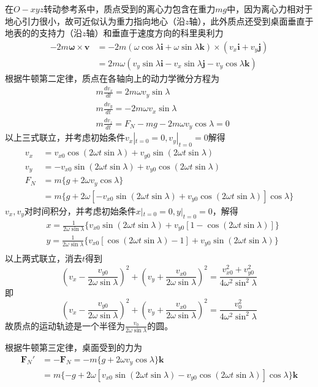 \documentclass[10pt,a4paper]{article}
\theoremstyle{remark}
\begin{document}
在$O-xyz$转动参考系中，质点受到的离心力包含在重力$mg$中，因为离心力相对于地心引力很小，故可近似认为重力指向地心（沿$z$轴），此外质点还受到桌面垂直于地表的的支持力（沿$z$轴）和垂直于速度方向的科里奥利力
\begin{align*}
-2m\bm{\omega}\times\bm{v} &= -2m(\omega\cos\lambda\bm{i} + \omega\sin\lambda\bm{k})\times(v_x\bm{i} + v_y\bm{j})\\
&= 2m\omega(v_y\sin\lambda\bm{i} - v_x\sin\lambda\bm{j} - v_y\cos\lambda\bm{k})
\end{align*}
根据牛顿第二定律，质点在各轴向上的动力学微分方程为
\begin{align*}
&m\frac{dv_x}{dt} = 2m\omega v_y\sin\lambda\\
&m\frac{dv_y}{dt} = -2m\omega v_x\sin\lambda\\
&m\frac{dv_z}{dt} = F_N - mg - 2m\omega v_y\cos\lambda = 0
\end{align*}
以上三式联立，并考虑初始条件$v_x|_{t = 0} = 0, v_y|_{t = 0} = 0$解得
\begin{align*}
v_x &= v_{x0}\cos(2\omega t\sin\lambda) + v_{y0}\sin(2\omega t\sin\lambda)\\
v_y &= -v_{x0}\sin(2\omega t\sin\lambda) + v_{y0}\cos(2\omega t\sin\lambda)\\
F_N &= m\{g + 2\omega v_y\cos\lambda\}\\
&= m\{g + 2\omega[-v_{x0}\sin(2\omega t\sin\lambda) + v_{y0}\cos(2\omega t\sin\lambda)]\cos\lambda\}
\end{align*}
$v_x, v_y$对时间积分，并考虑初始条件$x|_{t = 0} = 0,y|_{t = 0} = 0$，解得
\begin{align*}
&x = \frac{1}{2\omega\sin\lambda}\{v_{x0}\sin(2\omega t\sin\lambda) + v_{y0}[1 - \cos(2\omega t\sin\lambda)]\}\\
&y = \frac{1}{2\omega\sin\lambda}\{v_{x0}[\cos(2\omega t\sin\lambda) - 1] + v_{y0}\sin(2\omega t\sin\lambda)\}\\
\end{align*}
以上两式联立，消去$t$得到
\[
(v_{x} - \frac{v_{y0}}{2\omega\sin\lambda})^2 + (v_{y} + \frac{v_{x0}}{2\omega\sin\lambda})^2 = \frac{v_{x0}^2 + v_{y0}^2}{4\omega^2\sin^2\lambda}
\]
即
\[
(v_{x} - \frac{v_{y0}}{2\omega\sin\lambda})^2 + (v_{y} + \frac{v_{x0}}{2\omega\sin\lambda})^2 = \frac{v_0^2}{4\omega^2\sin^2\lambda}
\]
故质点的运动轨迹是一个半径为$\frac{v_0}{2\omega\sin\lambda}$的圆。

根据牛顿第三定律，桌面受到的力为
\begin{align*}
\bm{F}_{N}' &= -\bm{F}_{N}= -m\{g + 2\omega v_y\cos\lambda\}\bm{k}\\
&= m\{-g + 2\omega[v_{x0}\sin(2\omega t\sin\lambda) - v_{y0}\cos(2\omega t\sin\lambda)]\cos\lambda\}\bm{k}
\end{align*}
\end{document}
